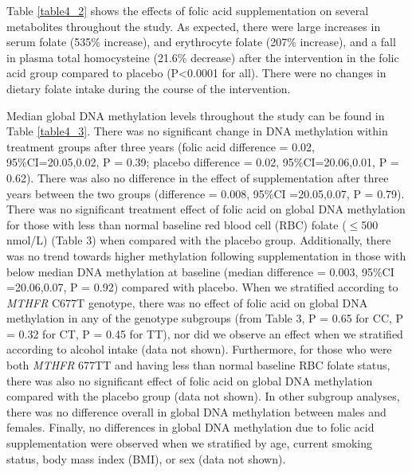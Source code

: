 \noindent Table \ref{table4_2} shows the effects of folic acid supplementation on several metabolites throughout the study. As expected, there were large increases in serum folate (535\% increase), and erythrocyte folate (207\% increase), and a fall in plasma total homocysteine (21.6\% decrease) after the intervention in the folic acid group compared to placebo (P<0.0001 for all). There were no changes in dietary folate intake during the course of the intervention.

\noindent Median global DNA methylation levels throughout the study can be found in Table \ref{table4_3}. There was no significant change in DNA methylation within treatment groups after three years (folic acid difference = 0.02, 95\%CI=20.05,0.02, P = 0.39; placebo difference = 0.02, 95\%CI=20.06,0.01, P = 0.62). There was also no difference in the effect of supplementation after three years between the two groups (difference = 0.008, 95\%CI =20.05,0.07, P = 0.79). There was no significant treatment effect of folic acid on global DNA methylation for those with less than normal baseline red blood cell (RBC) folate ($\leq$500 nmol/L) (Table 3) when compared with the placebo group. Additionally, there was no trend towards higher methylation following supplementation in those with below median DNA methylation at baseline (median difference = 0.003, 95\%CI =20.06,0.07, P = 0.92) compared with placebo. When we stratified according to \emph{MTHFR} C677T genotype, there was no effect of folic acid on global DNA methylation in any of the genotype subgroups (from Table 3, P = 0.65 for CC, P = 0.32 for CT, P = 0.45 for TT), nor did we observe an effect when we stratified according to alcohol intake (data not shown). Furthermore, for those who were both \emph{MTHFR} 677TT and having less than normal baseline RBC folate status, there was also no significant effect of folic acid on global DNA methylation compared with the placebo group (data not shown). In other subgroup analyses, there was no difference overall in global DNA methylation between males and females. Finally, no differences in global DNA methylation due to folic acid supplementation were observed when we stratified by age, current smoking status, body mass index (BMI), or sex (data not shown).


